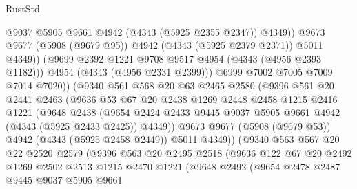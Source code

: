 \begin{lexlean}{RustStd}
\begin{coremodule}
                          @9037
                          @5905
                          @9661
                          @4942
                          (@4343 (@5925 @2355 @2347))
                          @4349))
                      @9673
                      @9677
                      (@5908 (@9679 @95))
                      @4942
                      (@4343 (@5925 @2379 @2371))
                      @5011
                      @4349))
                  (@9699 @2392 @1221 @9708 @9517 @4954 (@4343 (@4956 @2393 @1182)))
                  @4954
                  (@4343 (@4956 @2331 @2399)))
                @6999
                @7002
                @7005
                @7009
                @7014
                @7020))
            (@9340
              @561
              @568
              @20
              @63
              @2465
              @2580
              (@9396
                @561
                @20
                @2441
                @2463
                (@9636
                  @53
                  @67
                  @20
                  @2438
                  @1269
                  @2448
                  @2458
                  @1215
                  @2416
                  @1221
                  (@9648
                    @2438
                    (@9654
                      @2424
                      @2433
                      @9445
                      @9037
                      @5905
                      @9661
                      @4942
                      (@4343 (@5925 @2433 @2425))
                      @4349))
                  @9673
                  @9677
                  (@5908 (@9679 @53))
                  @4942
                  (@4343 (@5925 @2458 @2449))
                  @5011
                  @4349))
              (@9340
                @563
                @567
                @20
                @22
                @2520
                @2579
                (@9396
                  @563
                  @20
                  @2495
                  @2518
                  (@9636
                    @122
                    @67
                    @20
                    @2492
                    @1269
                    @2502
                    @2513
                    @1215
                    @2470
                    @1221
                    (@9648
                      @2492
                      (@9654
                        @2478
                        @2487
                        @9445
                        @9037
                        @5905
                        @9661

\end{coremodule}
\end{lexlean}
